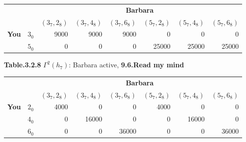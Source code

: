 \documentclass{article}
\begin{document}
\begin{description}
    \begin{center}
        \begin{tabular}{rrrrrrrr}
        \hline
        \hline
                   &            &                                          \multicolumn{ 6}{c}{{\bf Barbara}} \\

                   &            &  $(3_7,2_8)$ &  $(3_7,4_8)$ &  $(3_7,6_8)$ &  $(5_7,2_8)$ &  $(5_7,4_8)$ &  $(5_7,6_8)$ \\
        \hline
        \multicolumn{ 1}{c}{{\bf You}} &        $3_0$ &       9000 &       9000 &       9000 &          0 &          0 &          0 \\

        \multicolumn{ 1}{c}{{\bf }} &        $5_0$ &          0 &          0 &          0 &      25000 &      25000 &      25000 \\
        \hline
        \hline
        \end{tabular}

        {\bf Table.3.2.8 }$\Gamma ^2(h_7)$: Barbara active, {\bf 9.6.Read my mind}
    \end{center}

    \begin{center}
        \begin{tabular}{rrrrrrrr}
        \hline
        \hline
                   &            &                                          \multicolumn{ 6}{c}{{\bf Barbara}} \\

                   &            &  $(3_7,2_8)$ &  $(3_7,4_8)$ &  $(3_7,6_8)$ &  $(5_7,2_8)$ &  $(5_7,4_8)$ &  $(5_7,6_8)$ \\
        \hline
        \multicolumn{ 1}{c}{{\bf You}} &        $2_0$ &       4000 &          0 &          0 &       4000 &          0 &          0 \\

        \multicolumn{ 1}{c}{{\bf }} &        $4_0$ &          0 &      16000 &          0 &          0 &      16000 &          0 \\

        \multicolumn{ 1}{c}{{\bf }} &        $6_0$ &          0 &          0 &      36000 &          0 &          0 &      36000 \\
        \hline
        \hline
        \end{tabular}


\end{center}
\end{description}
\end{document}
